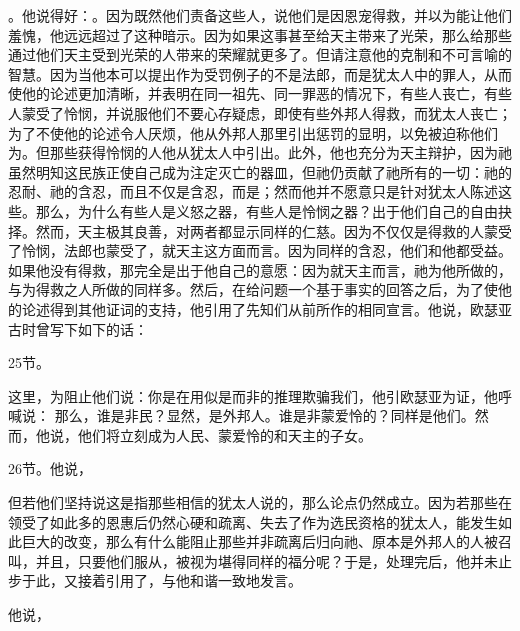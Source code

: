 。他说得好：。因为既然他们责备这些人，说他们是因恩宠得救，并以为能让他们羞愧，他远远超过了这种暗示。因为如果这事甚至给天主带来了光荣，那么给那些通过他们天主受到光荣的人带来的荣耀就更多了。但请注意他的克制和不可言喻的智慧。因为当他本可以提出作为受罚例子的不是法郎，而是犹太人中的罪人，从而使他的论述更加清晰，并表明在同一祖先、同一罪恶的情况下，有些人丧亡，有些人蒙受了怜悯，并说服他们不要心存疑虑，即使有些外邦人得救，而犹太人丧亡；为了不使他的论述令人厌烦，他从外邦人那里引出惩罚的显明，以免被迫称他们为。但那些获得怜悯的人他从犹太人中引出。此外，他也充分为天主辩护，因为祂虽然明知这民族正使自己成为注定灭亡的器皿，但祂仍贡献了祂所有的一切：祂的忍耐、祂的含忍，而且不仅是含忍，而是；然而他并不愿意只是针对犹太人陈述这些。那么，为什么有些人是义怒之器，有些人是怜悯之器？出于他们自己的自由抉择。然而，天主极其良善，对两者都显示同样的仁慈。因为不仅仅是得救的人蒙受了怜悯，法郎也蒙受了，就天主这方面而言。因为同样的含忍，他们和他都受益。如果他没有得救，那完全是出于他自己的意愿：因为就天主而言，祂为他所做的，与为得救之人所做的同样多。然后，在给问题一个基于事实的回答之后，为了使他的论述得到其他证词的支持，他引用了先知们从前所作的相同宣言。他说，欧瑟亚古时曾写下如下的话：\par

25节。 \par

这里，为阻止他们说：你是在用似是而非的推理欺骗我们，他引欧瑟亚为证，他呼喊说：  那么，谁是非民？显然，是外邦人。谁是非蒙爱怜的？同样是他们。然而，他说，他们将立刻成为人民、蒙爱怜的和天主的子女。\par

26节。他说， \par

但若他们坚持说这是指那些相信的犹太人说的，那么论点仍然成立。因为若那些在领受了如此多的恩惠后仍然心硬和疏离、失去了作为选民资格的犹太人，能发生如此巨大的改变，那么有什么能阻止那些并非疏离后归向祂、原本是外邦人的人被召叫，并且，只要他们服从，被视为堪得同样的福分呢？于是，处理完后，他并未止步于此，又接着引用了，与他和谐一致地发言。\par

他说，\par

